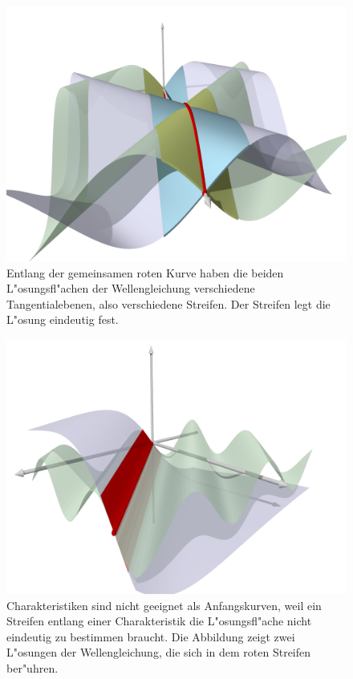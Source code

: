\begin{figure}
\centering
\includegraphics[width=\hsize]{../common/3d/streifen2.png}
\caption{Entlang der gemeinsamen roten Kurve haben die beiden
L"osungsfl"achen der Wellengleichung verschiedene Tangentialebenen,
also verschiedene Streifen. 
Der Streifen legt die L"osung eindeutig fest.
\label{skript:streifen:eindeutig}}
\end{figure}

\begin{figure}
\centering
\includegraphics[width=\hsize]{../common/3d/streifen1.png}
\caption{Charakteristiken sind nicht geeignet als Anfangskurven,
weil ein Streifen entlang einer Charakteristik die L"osungsfl"ache
nicht eindeutig zu bestimmen braucht. Die Abbildung zeigt zwei L"osungen
der Wellengleichung, die sich in dem roten Streifen ber"uhren.
\label{skript:streifen:zweideutig}}
\end{figure}


